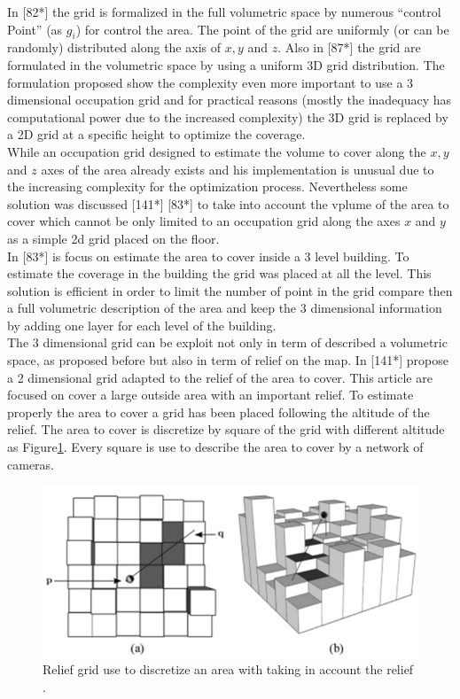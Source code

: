 In [82*] the grid is formalized in the full volumetric space by numerous “control Point” (as $g_i$) for control the area. The point of the grid are uniformly (or can be randomly) distributed along the axis of $x, y$ and $z$. Also in [87*] the grid are formulated in the volumetric space by using a uniform 3D grid distribution. The formulation proposed show the complexity even more important to use a 3 dimensional occupation grid and for practical reasons (mostly the inadequacy has computational power due to the increased complexity) the 3D grid is replaced by a 2D grid at a specific height to optimize the coverage. \\ 
While an occupation grid designed to estimate the volume to cover along the $ x, y $ and $ z $ axes of the area already exists and his implementation is unusual due to the increasing complexity for the optimization process.  
Nevertheless some solution was discussed [141*] [83*] to take into account the vplume of the area to cover which cannot be only limited to an occupation grid along the axes $ x $ and $ y $as a simple 2d grid placed on the floor.\\
In [83*] is focus on estimate the area to cover inside a 3 level building. To estimate the coverage in the building the grid was placed at all the level. This solution is efficient in order to limit the number of point in the grid compare then a full volumetric description of the area and keep the 3 dimensional information by adding one layer for each level of the building.  \\
The 3 dimensional grid can be exploit not only in term of described a volumetric space, as proposed before but also in term of relief on the map. 
In [141*] propose a 2 dimensional grid adapted to the relief of the area to cover. This article are focused on cover a large outside area with an important relief. To estimate properly the area to cover a grid has been placed following the altitude of the relief. The area to cover is discretize by square of the grid with different altitude as Figure\ref{fig:grilleRef141}. Every square is use to describe the area to cover by a network of cameras.  


\begin{figure}[t!]
   \includegraphics[width=\linewidth]{img/grilleRef141.png}
  \caption{ Relief grid use to discretize  an area with taking in account the relief  .}\label{fig:grilleRef141}
  \endminipage\hfill
\end{figure}

